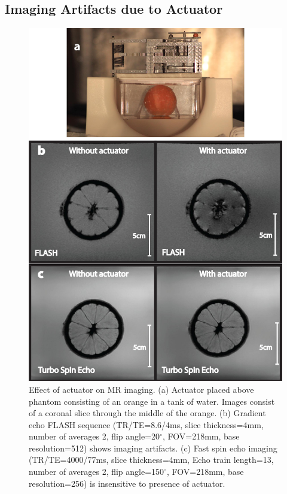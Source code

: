 \documentclass[journal]{IEEEtran}
\begin{document}
\subsection{Imaging Artifacts due to Actuator}
\label{subsec:ExpClosedLoopPositionControl}
\begin{figure}
\begin{center}
	\includegraphics[width=1.0\columnwidth]{Figure17.jpg}
\end{center}
\caption{Effect of actuator on MR imaging. 
(a) Actuator placed above phantom consisting of an orange in a tank of water. Images consist of a coronal slice through the middle of the orange.
(b) Gradient echo FLASH sequence (TR/TE=8.6/4ms, slice thickness=4mm, number of averages 2, flip angle=20$^\circ$, FOV=218mm, base resolution=512) shows imaging artifacts.
(c)  Fast spin echo imaging (TR/TE=4000/77ms, slice thickness=4mm, Echo train length=13, number of averages 2, flip angle=150$^\circ$, FOV=218mm, base resolution=256) is insensitive to presence of actuator.
 \label{fig:artifact}}
\end{figure}
\end{document}
